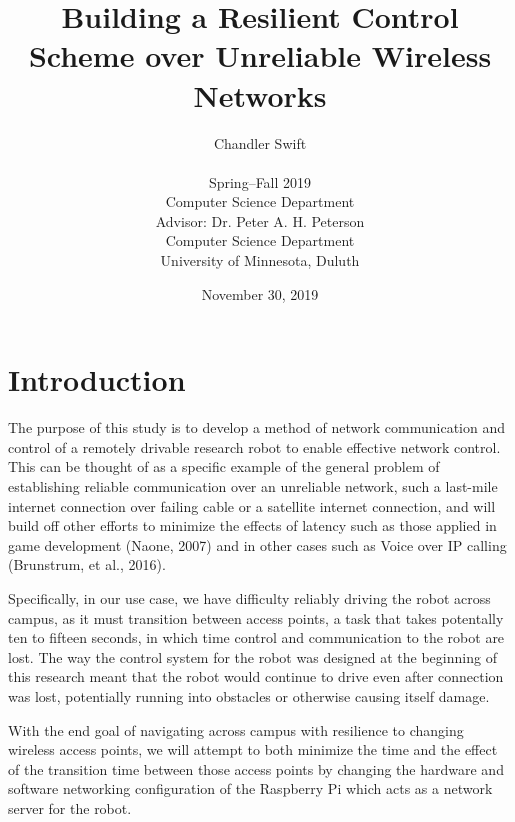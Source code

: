 \documentclass[letterpaper, 11pt]{article}
\title{Building a Resilient Control Scheme over Unreliable Wireless Networks}
\author{Chandler Swift \\ \\
  Spring--Fall 2019 \\
  Computer Science Department \\
  Advisor: Dr. Peter A. H. Peterson \\
  Computer Science Department \\
  University of Minnesota, Duluth
}
\date{November 30, 2019}
\begin{document}
\maketitle
\section{Introduction}
\begin{multicols}{2}
The purpose of this study is to develop a method of network communication and
control of a remotely drivable research robot to enable effective network
control. This can be thought of as a specific example of the general problem
of establishing reliable communication over an unreliable network, such a
last-mile internet connection over failing cable or a satellite internet
connection, and will build off other efforts to minimize the effects of
latency such as those applied in game development (Naone, 2007) and in other
cases such as Voice over IP calling (Brunstrum,  et al., 2016).

Specifically, in our use case, we have difficulty reliably driving the robot
across campus, as it must transition between access points, a task that takes
potentally ten to fifteen seconds, in which time control and communication to
the robot are lost. The way the control system for the robot was designed at
the beginning of this research meant that the robot would continue to drive
even after connection was lost, potentially running into obstacles or
otherwise causing itself damage.

With the end goal of navigating across campus with resilience to changing
wireless access points, we will attempt to both minimize the time and the
effect of the transition time between those access points by changing the
hardware and software networking configuration of the Raspberry Pi which
acts as a network server for the robot.
\end{multicols}
\end{document}
